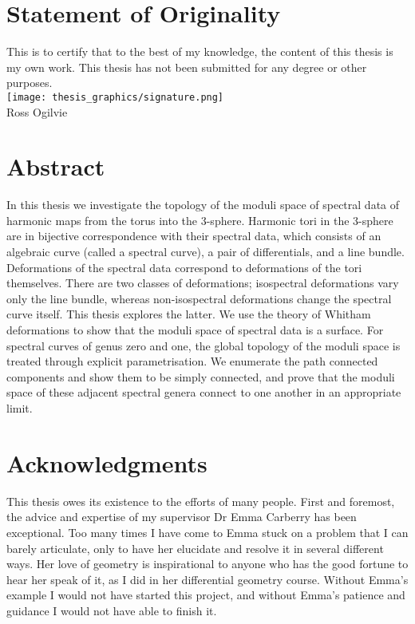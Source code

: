 
\chapter*{Statement of Originality}

This is to certify that to the best of my knowledge, the content of this thesis is my own work. This thesis has not been submitted for any degree or other purposes.
\\
\texttt{[image: thesis\_graphics/signature.png]}
\\
Ross Ogilvie

\cleardoublepage

\chapter*{Abstract}
In this thesis we investigate the topology of the moduli space of spectral data of harmonic maps from the torus into the 3-sphere.
Harmonic tori in the 3-sphere are in bijective correspondence with their spectral data, which consists of an algebraic curve (called a spectral curve), a pair of differentials, and a line bundle. Deformations of the spectral data correspond to deformations of the tori themselves. There are two classes of deformations; isospectral deformations vary only the line bundle, whereas non-isospectral deformations change the spectral curve itself.
This thesis explores the latter.
We use the theory of Whitham deformations to show that the moduli space of spectral data is a surface. For spectral curves of genus zero and one, the global topology of the moduli space is treated through explicit parametrisation. We enumerate the path connected components and show them to be simply connected, and prove that the moduli space of these adjacent spectral genera connect to one another in an appropriate limit.

\cleardoublepage

\chapter*{Acknowledgments}

This thesis owes its existence to the efforts of many people. First and foremost, the advice and expertise of my supervisor Dr Emma Carberry has been exceptional.
Too many times I have come to Emma stuck on a problem that I can barely articulate, only to have her elucidate and resolve it in several different ways.
Her love of geometry is inspirational to anyone who has the good fortune to hear her speak of it, as I did in her differential geometry course. Without Emma's example I would not have started this project, and without Emma's patience and guidance I would not have able to finish it.


